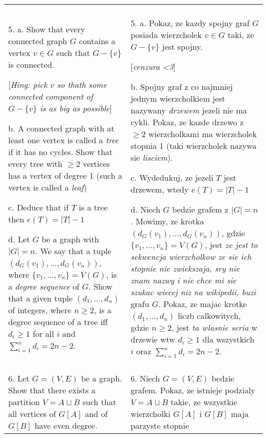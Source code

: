 \documentclass{article}[13pt]
\begin{document}
\begin{tabularx}{\textwidth}{ X X }
         & \\

        5. a. Show that every connected graph $G$ contains a vertex $v\in G$ such that $G-\{v\}$ is connected.

        [\emph{Hing: pick $v$ so thath some connected component of $G-\{v\}$ is as big as possible}]

        b. A connected graph with at least one vertex is called a \emph{tree} if it has no cycles. Show that every tree with $\geq2$ vertices has a vertex of degree 1 (such a vertex is called a \emph{leaf})

        c. Deduce that if $T$ is a tree then $e(T)=|T|-1$

        d. Let $G$ be a graph with $|G|=n$. We say that a tuple $(d_G(v_1),...,d_G(v_n))$, where $\{v_1,..., v_n\}=V(G)$, is a \emph{degree sequence} of $G$. Show that a given tuple $(d_1,...,d_n)$ of integers, where $n\geq2$, is a degree sequence of a tree iff $d_i\geq1$ for all $i$ and $\sum\limits_{i=1}^nd_i=2n-2$. & 5. a. Pokaz, ze kazdy spojny graf $G$ posiada wierzcholek $v\in G$ taki, ze $G-\{v\}$ jest spojny.

        [\emph{cenzura <3}]

        b. Spojny graf z co najmniej jednym wierzcholkiem jest nazywany \emph{\color{def}drzewem} jezeli nie ma cykli. Pokaz, ze kazde {\color{def}drzewo} z $\geq2$ wierzcholkami ma wierzcholek stopnia 1 (taki wierzcholek nazywa sie \emph{lisciem}).

        c. Wydedukuj, ze jezeli $T$ jest drzewem, wtedy $e(T)=|T|-1$

        d. Niech $G$ bedzie grafem z $|G|=n$. Mowimy, ze krotka $(d_G(v_1),...,d_G(v_n))$, gdzie $\{v_1,..., v_n\}=V(G)$, jest \emph{ze jest to sekwencja wierzcholkow ze sie ich stopnie nie zwiekszaja, sry nie znam nazwy i nie chce mi sie szukac wiecej niz na wikipedii, buzi} grafu $G$. Pokaz, ze majac krotke $(d_1,...,d_n)$ liczb calkowitych, gdzie $n\geq2$, jest \emph{ta wlasnie seria} w {\color{def}drzewie} wtw $d_i\geq1$ dla wszystkich $i$ oraz $\sum\limits_{i=1}^nd_i=2n-2$.\\

         & \\

        6. Let $G=(V,E)$ be a graph. Show that there exists a partition $V=A\sqcup B$ such that all vertices of $G[A]$ and of $G[B]$ have even degree. & 6. Niech $G=(V,E)$ bedzie grafem. Pokaz, ze istnieje podzialy $V=A\sqcup B$ takie, ze wszystkie wierzcholki $G[A]$ i $G[B]$ maja parzyste stopnie\\


\end{tabularx}
\end{document}
